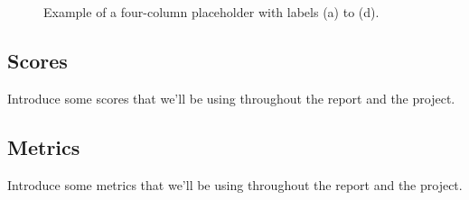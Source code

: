 \begin{figure*}[h]
    \centering
    \caption{Example of a four-column placeholder with labels (a) to (d).}
    \label{fig:four_columns}
\end{figure*}

\subsection{Scores}
Introduce some scores that we'll be using throughout the report and the project.

\subsection{Metrics}
Introduce some metrics that we'll be using throughout the report and the project.